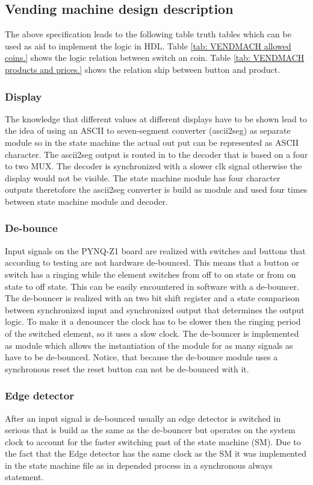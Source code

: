 \subsection{Vending machine design description}\label{subsec: Vending machine design description}
The above specification leads to the following table truth tables which can be used as aid to implement the logic in HDL. Table \ref{tab: VENDMACH allowed coins.} shows the logic relation between switch an coin. Table \ref{tab: VENDMACH products and prices.} shows the relation ship between button and product. 
\subsubsection{Display}\label{subsubsec: Display}
The knowledge that different values at different displays have to be shown lead to the idea of using an ASCII to seven-segment converter (ascii2seg) as separate module so in the state machine the actual out put can be represented as ASCII character. The ascii2seg output is routed in to the decoder that is based on a four to two MUX. The decoder is synchronized with a slower clk signal otherwise the display would not be visible. The state machine module has four character outputs theretofore the ascii2seg converter is build as module and used four times between state machine module and decoder.
\subsubsection{De-bounce}\label{subsubsec: De-bounce}
Input signals on the PYNQ-Z1 board are realized with switches and buttons that according to testing are not hardware de-bounced. This means that a button or switch has a ringing while the element switches from off to on state or from on state to off state. This can be easily encountered in software with a de-bouncer. The de-bouncer is realized with an two bit shift register and a state comparison between synchronized input and synchronized output that determines the output logic. To make it a denouncer the clock has to be slower then the ringing period of the switched element, so it uses a slow clock. The de-bouncer is implemented as module which allows the instantiation of the module for as many signals as have to be de-bounced. Notice, that because the de-bounce module uses a synchronous reset the reset button can not be de-bounced with it.

\subsubsection{Edge detector}\label{subsubsec: Edge detector}
After an input signal is de-bounced usually an edge detector is switched in serious that is build as the same as the de-bouncer but operates on the system clock to account for the faster switching past of the state machine (SM). Due to the fact that the Edge detector has the same clock as the SM it was implemented in the state machine file as in depended process in a synchronous always statement.

